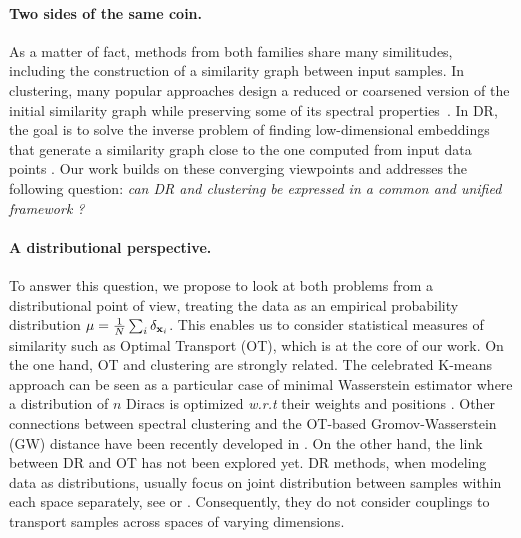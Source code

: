 \paragraph{Two sides of the same coin.} As a matter of fact, methods from both families share many similitudes, %
including the construction of a similarity graph between input samples. In clustering, many popular approaches design a reduced or coarsened version of the initial similarity graph while preserving some of its spectral properties~\cite{von2007tutorial, schaeffer2007graph}. 
In DR, the goal is to solve the inverse problem of finding low-dimensional embeddings that generate a similarity graph close to the %
one computed from input data points \cite{ham2004kernel,hinton2002stochastic}.
Our work builds on these converging viewpoints and addresses the following question: \emph{can DR and clustering  be expressed in a common and unified framework ?}

\paragraph{A distributional perspective.} To answer this question, we
propose to look at both problems from a distributional point of view, treating the data as an empirical probability distribution
$\mu=\frac{1}{N}\sum_i\delta_{{\mathbf{x}}_i}$. 
This enables us to consider statistical measures of similarity such as Optimal Transport (OT), which is at the core of our work.
On the one hand, OT and clustering are strongly related.
The celebrated K-means approach can be seen as a particular case of minimal Wasserstein estimator where a distribution of $n$ Diracs is optimized \textit{w.r.t} their weights and positions \cite{Canas12}. Other connections between spectral clustering and the OT-based Gromov-Wasserstein (GW) distance have been recently developed in \citet{chowdhury2021generalized,chen2023gromov,vincent2021semi}. On the other hand, the link between DR and OT has not been explored yet. DR methods, when modeling data as distributions,
usually focus on joint distribution between samples within each space separately, see \eg \citet{van2023snekhorn} or \citet{lu2019doubly}.
Consequently, they do not consider couplings to transport samples across spaces of varying dimensions. %


